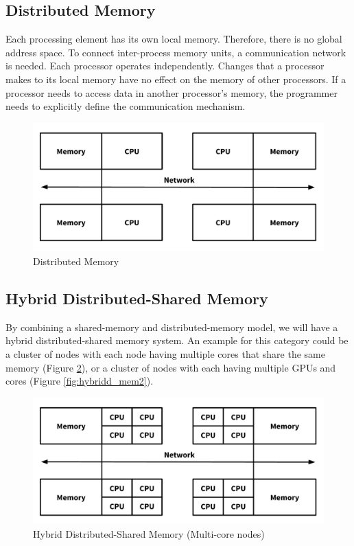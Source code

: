 \subsection{Distributed Memory}
Each processing element has its own local memory. Therefore, there is no global address space. To connect inter-process memory units, a communication network is needed.
Each processor operates independently. Changes that a processor makes to its local memory have no effect on the memory of other processors. If a processor needs to access data in another processor's memory, the programmer needs to explicitly define the communication mechanism.

\begin{figure}[ht]
  \centering
  \includegraphics[scale=0.35]{images/distributed_mem.png}
  \caption{Distributed Memory}
  \label{fig:distributed_mem}
\end{figure}

\subsection{Hybrid Distributed-Shared Memory}
By combining a shared-memory and distributed-memory model, we will have a hybrid distributed-shared memory system. An example for this category could be a cluster of nodes with each node having multiple cores that share the same memory (Figure \ref{fig:hybridd_mem}), or a cluster of nodes with each having multiple GPUs and cores (Figure \ref{fig:hybridd_mem2}).

\begin{figure}[ht]
  \centering
  \includegraphics[scale=0.35]{images/hybrid_mem.png}
  \caption{Hybrid Distributed-Shared Memory (Multi-core nodes)}
  \label{fig:hybridd_mem}
\end{figure}


